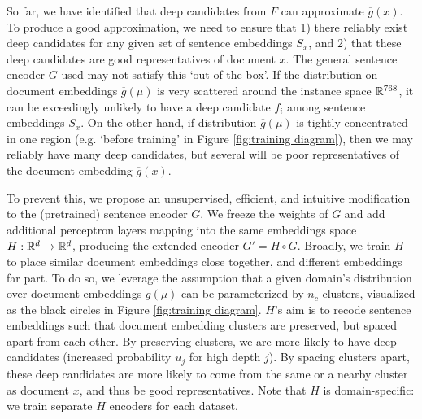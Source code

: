 So far, we have identified that deep candidates from $F$ can approximate $\overline{g}(x)$. To produce a good approximation, we need to ensure that 1) there reliably exist deep candidates for any given set of sentence embeddings $S_x$, and 2) that these deep candidates are good representatives of document $x$. The general sentence encoder $G$ used may not satisfy this `out of the box'. If the distribution on document embeddings $\overline{g}(\mu)$ is very scattered around the instance space ${\mathbb R}^{768}$, it can be exceedingly unlikely to have a deep candidate $f_i$ among sentence embeddings $S_x$. On the other hand, if distribution $\overline{g}(\mu)$ is tightly concentrated in one region (e.g. `before training' in Figure \ref{fig:training diagram}), then we may reliably have many deep candidates, but several will be poor representatives of the document embedding $\overline{g}(x)$. 

To prevent this, we propose an unsupervised, efficient, and intuitive modification to the (pretrained) sentence encoder $G$. We freeze the weights of $G$ and add additional perceptron layers mapping into the same embeddings space $H:{\mathbb R}^d \rightarrow {\mathbb R}^d$, producing the extended encoder $G' = H \circ G$. Broadly, we train $H$ to place similar document embeddings close together, and different embeddings far part.  To do so, we leverage the assumption that a given domain's distribution over document embeddings $\overline{g}(\mu)$ can be parameterized by $n_c$ clusters, visualized as the black circles in Figure \ref{fig:training diagram}. $H$'s aim is to recode sentence embeddings such that document embedding clusters are preserved, but spaced apart from each other. By preserving clusters, we are more likely to have deep candidates (increased probability $u_j$ for high depth $j$). By spacing clusters apart, these deep candidates are more likely to come from the same or a nearby cluster as document $x$, and thus be good representatives. Note that $H$ is domain-specific: we train separate $H$ encoders for each dataset. 



